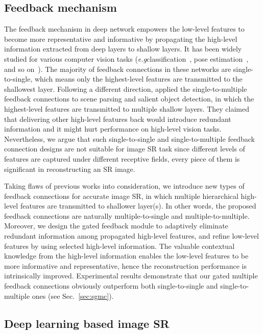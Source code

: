 \documentclass{bmvc2k}
\def\eg{\emph{e.g}\bmvaOneDot}
\begin{document}
	\subsection{Feedback mechanism}
	\label{sec:feedback_mechanism}
	The feedback mechanism in deep network empowers the low-level features to become more representative and informative by propagating the high-level information extracted from deep layers to shallow layers. It has been widely studied for various computer vision tasks (\eg classification~\cite{zamir2017feedback}, pose estimation~\cite{carreira2016human}, and so on~\cite{pinherio2014recurrent, liang2015convolutional, jin2017multi, sam2018top, zhang2018progressive, li2019srfbn}). The majority of feedback connections in these networks are single-to-single, which means only the highest-level features are transmitted to the shallowest layer. Following a different direction, \cite{jin2017multi, zhang2018progressive} applied the single-to-multiple feedback connections to scene parsing and salient object detection, in which the highest-level features are transmitted to multiple shallow layers. They claimed that delivering other high-level features back would introduce redundant information and it might hurt performance on high-level vision tasks. Nevertheless, we argue that such single-to-single and single-to-multiple feedback connection designs are not suitable for image SR task since different levels of features are captured under different receptive fields, every piece of them is significant in reconstructing an SR image.
	
	Taking flaws of previous works into consideration, we introduce new types of feedback connections for accurate image SR, in which multiple hierarchical high-level features are transmitted to shallower layer(s). In other words, the proposed feedback connections are naturally multiple-to-single and multiple-to-multiple. Moreover, we design the gated feedback module to adaptively eliminate redundant information among propagated high-level features, and refine low-level features by using selected high-level information. The valuable contextual knowledge from the high-level information enables the low-level features to be more informative and representative, hence the reconstruction performance is intrinsically improved. Experimental results demonstrate that our gated multiple feedback connections obviously outperform both single-to-single and single-to-multiple ones (see Sec.~\ref{sec:sgmc}).
	
	\subsection{Deep learning based image SR}
\end{document}
